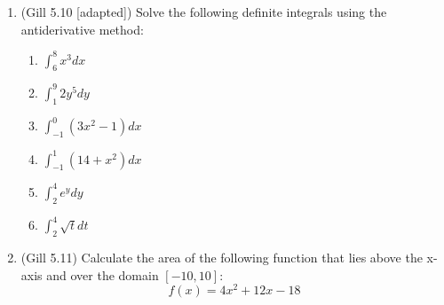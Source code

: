\documentclass[11pt]{article}
\begin{document}
\begin{enumerate}
\item (Gill 5.10 [adapted]) Solve the following definite integrals using the antiderivative method:
\begin{enumerate}
 \item $\int_{6}^{8} x^3 dx$ 
 \item $\int_{1}^{9} 2y^5 dy$ 
 \item $\int_{-1}^{0} (3x^2 - 1)dx$ 
 \item $\int_{-1}^{1} (14 + x^2) dx$ 
 \item $\int_{2}^{4} e^y dy$ 
 \item $\int_{2}^{4} \sqrt{t}dt$
\end{enumerate}




\item (Gill 5.11) Calculate the area of the following function that lies above the x-axis and over the domain $[-10,10]$:
\begin{equation*}
f(x) = 4x^2 + 12x - 18
\end{equation*}





\end{enumerate}
\end{document}
